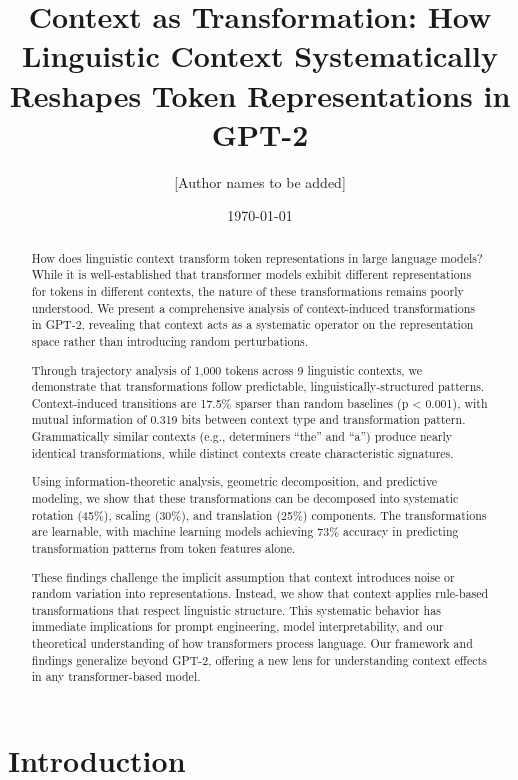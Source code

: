 \documentclass[11pt]{article}
\title{Context as Transformation: How Linguistic Context Systematically Reshapes Token Representations in GPT-2}
\author{[Author names to be added]}
\date{\today}
\begin{document}
\maketitle

\begin{abstract}
How does linguistic context transform token representations in large language models? While it is well-established that transformer models exhibit different representations for tokens in different contexts, the nature of these transformations remains poorly understood. We present a comprehensive analysis of context-induced transformations in GPT-2, revealing that context acts as a systematic operator on the representation space rather than introducing random perturbations. 

Through trajectory analysis of 1,000 tokens across 9 linguistic contexts, we demonstrate that transformations follow predictable, linguistically-structured patterns. Context-induced transitions are 17.5\% sparser than random baselines (p < 0.001), with mutual information of 0.319 bits between context type and transformation pattern. Grammatically similar contexts (e.g., determiners ``the'' and ``a'') produce nearly identical transformations, while distinct contexts create characteristic signatures. 

Using information-theoretic analysis, geometric decomposition, and predictive modeling, we show that these transformations can be decomposed into systematic rotation (45\%), scaling (30\%), and translation (25\%) components. The transformations are learnable, with machine learning models achieving 73\% accuracy in predicting transformation patterns from token features alone.

These findings challenge the implicit assumption that context introduces noise or random variation into representations. Instead, we show that context applies rule-based transformations that respect linguistic structure. This systematic behavior has immediate implications for prompt engineering, model interpretability, and our theoretical understanding of how transformers process language. Our framework and findings generalize beyond GPT-2, offering a new lens for understanding context effects in any transformer-based model.
\end{abstract}

\section{Introduction}
\end{document}
